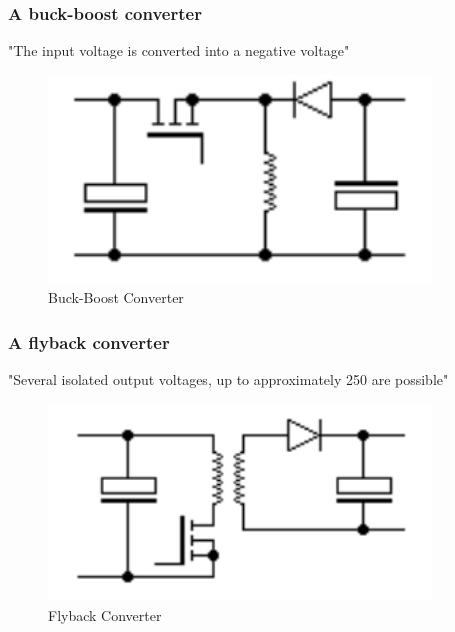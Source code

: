 \subsubsection{A buck-boost converter}
 "The input voltage is converted into a negative voltage"\cite{SMPSD}
\begin{figure}[H]
\begin{center}
\includegraphics[width=4in]{includes/BuckBoost}
\caption{Buck-Boost Converter}
\label{fig:1}
\end{center}
\end{figure}

\subsubsection{A flyback converter} 
"Several isolated output voltages, up to approximately 250 are possible"\cite{SMPSD}
\begin{figure}[H]
\begin{center}
\includegraphics[width=4in]{includes/Flyback}
\caption{Flyback Converter}
\label{fig:1}
\end{center}
\end{figure}

